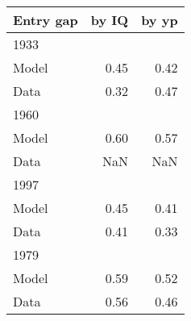 \begin{tabular}{lrr}
\hline
Entry gap & by IQ  & by yp  \\ 
\hline
1933 &   &   \\ 
Model & 0.45  & 0.42  \\ 
Data & 0.32  & 0.47  \\ 
1960 &   &   \\ 
Model & 0.60  & 0.57  \\ 
Data & NaN  & NaN  \\ 
1997 &   &   \\ 
Model & 0.45  & 0.41  \\ 
Data & 0.41  & 0.33  \\ 
1979 &   &   \\ 
Model & 0.59  & 0.52  \\ 
Data & 0.56  & 0.46  \\ 
\hline
\end{tabular}%
